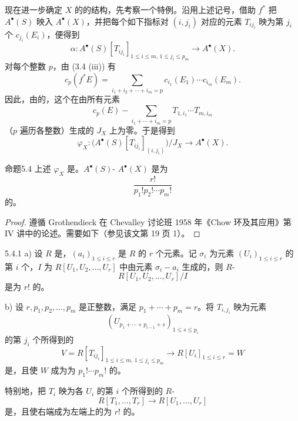 现在进一步确定 $X$ 的的结构，先考察一个特例。沿用上述记号，借助 $f^*$ 把 $A^\bullet(S)$ 映入 $A^\bullet(X)$，并把每个如下指标对 $(i,j_i)$ 对应的元素 $T_{ij_i}$ 映为第 $j_i$ 个 $c_{j_i}(E_i)$，便得到
\[
 \alpha:A^\bullet(S)[T_{ij_i}]_{1\le i\le m,\,1\le j_i\le p_m}
 \longrightarrow A^\bullet(X).
\]
对每个整数 $p$，由 (3.4 (iii)) 有
\[
 c_p(f^*E)=\sum_{i_1+i_2+\cdots+i_m=p}
 c_{i_1}(E_1)\cdots c_{i_m}(E_m).
\]
因此，由的，这个在由所有元素
\[
 c_p(E)-\sum_{i_1+\cdots+i_m=p}T_{1,i_1}\cdots T_{m,i_m}
\]
（$p$ 遍历各整数）生成的 $J_X$ 上为零。于是得到
\[
 \varphi_X:\bigl(A^\bullet(S)[T_{ij_i}]_{(i,j_i)}\bigr)/J_X
 \longrightarrow A^\bullet(X).
\]
\begin{SGAresult}{命题}{5.4}
上述 $\varphi_X$ 是。$A^\bullet(S)$- $A^\bullet(X)$ 是为
\[
 \frac{r!}{p_1!p_2!\cdots p_m!}
\]
的。
\end{SGAresult}
\begin{proof}
遵循 Grothendieck 在 Chevalley 讨论班 1958 年《Chow 环及其应用》第 IV 讲中的论述。需要如下（参见该文第 19 页 1）。
\end{proof}
\begin{SGAresult}{}{5.4.1}
a) 设 $R$ 是，$(a_i)_{1\le i\le r}$ 是 $R$ 的 $r$ 个元素。记 $\sigma_i$ 为元素 $(U_i)_{1\le i\le r}$ 的第 $i$ 个，$I$ 为 $R[U_1,U_2,\ldots,U_r]$ 中由元素 $\sigma_i-a_i$ 生成的，则 $R$-
\[
 R[U_1,U_2,\ldots,U_r]/I
\]
是为 $r!$ 的。

b) 设 $r,p_1,p_2,\ldots,p_m$ 是正整数，满足 $p_1+\cdots+p_m=r$。将 $T_{i,j_i}$ 映为元素
\[
 (U_{p_1+\cdots+p_{i-1}+s})_{1\le s\le p_i}
\]
的第 $j_i$ 个所得到的
\[
 V=R[T_{ij_i}]_{1\le i\le m,\,1\le j_i\le p_m}
 \longrightarrow R[U_i]_{1\le i\le r}=W
\]
是，且使 $W$ 成为为 $p_1!\cdots p_m!$ 的。

特别地，把 $T_i$ 映为各 $U_i$ 的第 $i$ 个所得到的 $R$-
\[
 R[T_1,\ldots,T_r]\longrightarrow R[U_1,\ldots,U_r]
\]
是，且使右端成为左端上的为 $r!$ 的。
\end{SGAresult}
